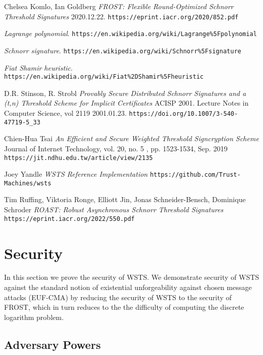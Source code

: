 \documentclass{article}
\begin{document}
\begin{thebibliography}{7}

  Chelsea Komlo, Ian Goldberg
  \emph{FROST: Flexible Round-Optimized Schnorr Threshold Signatures} 2020.12.22.
  \texttt{https://eprint.iacr.org/2020/852.pdf}

  \emph{Lagrange polynomial}.
  \texttt{https://en.wikipedia.org/wiki/Lagrange\%5Fpolynomial}

  \emph{Schnorr signature}.
  \texttt{https://en.wikipedia.org/wiki/Schnorr\%5Fsignature}

  \emph{Fiat Shamir heuristic}.
  \texttt{https://en.wikipedia.org/wiki/Fiat\%2DShamir\%5Fheuristic}

  D.R. Stinson, R. Strobl
  \emph{Provably Secure Distributed Schnorr Signatures and a (t,n) Threshold Scheme for Implicit Certificates} ACISP 2001. Lecture Notes in Computer Science, vol 2119 2001.01.23.
  \texttt{https://doi.org/10.1007/3-540-47719-5\_33}

  Chien-Hua Tsai
  \emph{An Efficient and Secure Weighted Threshold Signcryption Scheme} Journal of Internet Technology, vol. 20, no. 5 , pp. 1523-1534, Sep. 2019
  \texttt{https://jit.ndhu.edu.tw/article/view/2135}

  Joey Yandle
  \emph{WSTS Reference Implementation}
  \texttt{https://github.com/Trust-Machines/wsts}

  Tim Ruffing, Viktoria Ronge, Elliott Jin, Jonas Schneider-Bensch, Dominique Schroder
  \emph{ROAST: Robust Asynchronous Schnorr Threshold Signatures} 
  \texttt{https://eprint.iacr.org/2022/550.pdf}

\end{thebibliography}

\appendix
\newpage
\onecolumn

\section{
  Security
}

In this section we prove the security of WSTS. We demonstrate
security of WSTS against the standard notion of existential unforgeability against chosen message attacks (EUF-CMA) by reducing the security of WSTS to the security of FROST, which in turn reduces to the the difficulty of computing the discrete logarithm problem.

\subsection{Adversary Powers}
\end{document}
